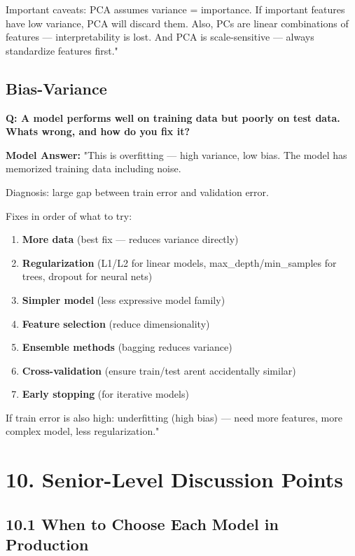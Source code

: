 \documentclass[11pt]{article}
\providecommand{\tightlist}{\setlength{\itemsep}{1pt}\setlength{\parskip}{0pt}}
\begin{document}
Important caveats: PCA assumes variance = importance. If important features have low variance, PCA will discard them. Also, PCs are linear combinations of features --- interpretability is lost. And PCA is scale-sensitive --- always standardize features first."

\subsection{Bias-Variance}\label{bias-variance}

\textbf{Q: A model performs well on training data but poorly on test data. What\textquotesingle s wrong, and how do you fix it?}

\textbf{Model Answer:}
"This is overfitting --- high variance, low bias. The model has memorized training data including noise.

Diagnosis: large gap between train error and validation error.

Fixes in order of what to try:

\begin{enumerate}
\def\labelenumi{\arabic{enumi}.}
\tightlist
\item
  \textbf{More data} (best fix --- reduces variance directly)
\item
  \textbf{Regularization} (L1/L2 for linear models, max\_depth/min\_samples for trees, dropout for neural nets)
\item
  \textbf{Simpler model} (less expressive model family)
\item
  \textbf{Feature selection} (reduce dimensionality)
\item
  \textbf{Ensemble methods} (bagging reduces variance)
\item
  \textbf{Cross-validation} (ensure train/test aren\textquotesingle t accidentally similar)
\item
  \textbf{Early stopping} (for iterative models)
\end{enumerate}

If train error is also high: underfitting (high bias) --- need more features, more complex model, less regularization."

\section{10. Senior-Level Discussion Points}\label{10-senior-level-discussion-points}

\subsection{10.1 When to Choose Each Model in Production}\label{101-when-to-choose-each-model-in-production}
\end{document}
